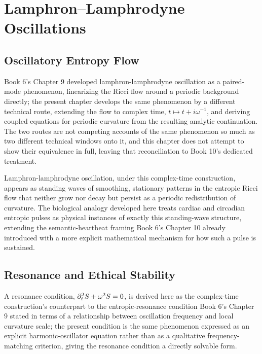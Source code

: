 \part{Lamphron--Lamphrodyne Oscillations}

\chapter{Oscillatory Entropy Flow}

Book 6's Chapter 9 developed lamphron-lamphrodyne oscillation as a paired-mode phenomenon, linearizing the Ricci flow around a periodic background directly; the present chapter develops the same phenomenon by a different technical route, extending the flow to complex time, $t \mapsto t + i\omega^{-1}$, and deriving coupled equations for periodic curvature from the resulting analytic continuation. The two routes are not competing accounts of the same phenomenon so much as two different technical windows onto it, and this chapter does not attempt to show their equivalence in full, leaving that reconciliation to Book 10's dedicated treatment.

Lamphron-lamphrodyne oscillation, under this complex-time construction, appears as standing waves of smoothing, stationary patterns in the entropic Ricci flow that neither grow nor decay but persist as a periodic redistribution of curvature. The biological analogy developed here treats cardiac and circadian entropic pulses as physical instances of exactly this standing-wave structure, extending the semantic-heartbeat framing Book 6's Chapter 10 already introduced with a more explicit mathematical mechanism for how such a pulse is sustained.

\chapter{Resonance and Ethical Stability}

A resonance condition, $\partial_t^2 S + \omega^2 S = 0$, is derived here as the complex-time construction's counterpart to the entropic-resonance condition Book 6's Chapter 9 stated in terms of a relationship between oscillation frequency and local curvature scale; the present condition is the same phenomenon expressed as an explicit harmonic-oscillator equation rather than as a qualitative frequency-matching criterion, giving the resonance condition a directly solvable form.

